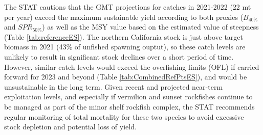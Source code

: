 \documentclass[
  english,
  a4paper,
]{article}
\begin{document}
The STAT cautions that the GMT projections for catches in 2021-2022 (22 mt per year) exceed the maximum sustainable yield according to both proxies (\(B_{40\%}\) and \(SPR_{50\%}\)) as well as the MSY value based on the estimated value of steepness (Table \ref{tab:referenceES}). The northern California stock is just above target biomass in 2021 (43\% of unfished spawning ouptut), so these catch levels are unlikely to result in significant stock declines over a short period of time. However, similar catch levels would exceed the overfishing limits (OFL) if carried forward for 2023 and beyond (Table \ref{tab:CombinedRefPtsES}), and would be unsustainable in the long term. Given recent and projected near-term exploitation levels, and especially if vermilion and sunset rockfishes continue to be managed as part of the minor shelf rockfish complex, the STAT recommends regular monitoring of total mortality for these two species to avoid excessive stock depletion and potential loss of yield.
\end{document}
